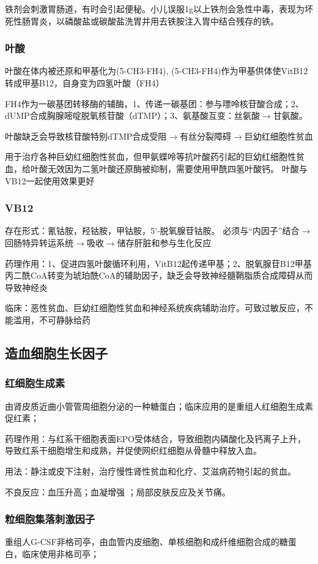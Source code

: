 \documentclass[UTF8]{ctexbook}
\begin{document}
铁剂会刺激胃肠道，有时会引起便秘。小儿误服1g以上铁剂会急性中毒，表现为坏死性肠胃炎，以磷酸盐或碳酸盐洗胃并用去铁胺注入胃中结合残存的铁。
\subsubsection{叶酸}
叶酸在体内被还原和甲基化为(5-CH3-FH4), (5-CH3-FH4)作为甲基供体使VitB12转成甲基B12，自身变为四氢叶酸（FH4）

FH4作为一碳基团转移酶的辅酶，1、传递一碳基团：参与嘌呤核苷酸合成；2、dUMP合成胸腺嘧啶脱氧核苷酸（dTMP）；3、氨基酸互变：丝氨酸\(\rightarrow\)甘氨酸。

叶酸缺乏会导致核苷酸特别dTMP合成受阻\(\rightarrow\)有丝分裂障碍\(\rightarrow\)巨幼红细胞性贫血

用于治疗各种巨幼红细胞性贫血，但甲氨蝶呤等抗叶酸药引起的巨幼红细胞性贫血，给叶酸无效因为二氢叶酸还原酶被抑制，需要使用甲酰四氢叶酸钙。
叶酸与VB12一起使用效果更好
\subsubsection{VB12}存在形式：氰钴胺，羟钴胺，甲钴胺，5'-脱氧腺苷钴胺。
必须与“内因子”结合\(\rightarrow\)回肠特异转运系统\(\rightarrow\)吸收\(\rightarrow\)储存肝脏和参与生化反应

药理作用：1、促进四氢叶酸循环利用，VitB12起传递甲基；2、脱氧腺苷B12甲基丙二酰CoA转变为琥珀酰CoA的辅助因子，缺乏会导致神经髓鞘脂质合成障碍从而导致神经炎

临床：恶性贫血、巨幼红细胞性贫血和神经系统疾病辅助治疗。可致过敏反应，不能滥用，不可静脉给药

\subsection{造血细胞生长因子}
\subsubsection{红细胞生成素}
由肾皮质近曲小管管周细胞分泌的一种糖蛋白；临床应用的是重组人红细胞生成素促红素；

药理作用：与红系干细胞表面EPO受体结合，导致细胞内磷酸化及钙离子上升，导致红系干细胞增生和成熟，并促使网织红细胞从骨髓中释放入血。

用法：静注或皮下注射，治疗慢性肾性贫血和化疗、艾滋病药物引起的贫血。

不良反应：血压升高；血凝增强 ；局部皮肤反应及关节痛。
\subsubsection{粒细胞集落刺激因子}
重组人G-CSF非格司亭，由血管内皮细胞、单核细胞和成纤维细胞合成的糖蛋白，临床使用非格司亭；
\end{document}

